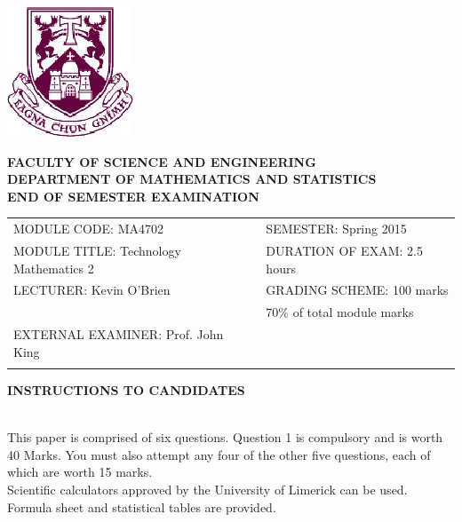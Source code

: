 \documentclass[a4paper,12pt]{article}
\begin{document}
\begin{center}
       \includegraphics[scale=0.60]{shieldtransparent2}
\end{center}

\begin{center}
\vspace{1cm}
\large \bf {FACULTY OF SCIENCE AND ENGINEERING} \\[0.5cm]
\normalsize DEPARTMENT OF MATHEMATICS AND STATISTICS \\[1.25cm]
\large \bf {END OF SEMESTER EXAMINATION} \\[1.5cm]
\end{center}

\begin{tabular}{ll}
MODULE CODE: MA4702 & SEMESTER: Spring 2015\\[1cm]
MODULE TITLE: Technology Mathematics 2 & DURATION OF EXAM: 2.5 hours \\[1cm]
LECTURER: Kevin O'Brien & GRADING SCHEME: 100 marks\\
 & \phantom{GRADING SCHEME:} \footnotesize {70\% of total module marks}   \\[0.8cm]
EXTERNAL EXAMINER: Prof. John King & \\[1cm]
\\[1cm]
\end{tabular}
\begin{center}
{\bf INSTRUCTIONS TO CANDIDATES}
\end{center}

{\noindent \\ This paper is comprised of six questions. Question 1 is compulsory and is worth 40 Marks.  You must also attempt any four of the other five questions, each of which are worth 15 marks.
\\ Scientific calculators approved by the University of Limerick can be used. 
\\ Formula sheet and statistical tables are provided.
}
\normalsize
\newpage
\end{document}
